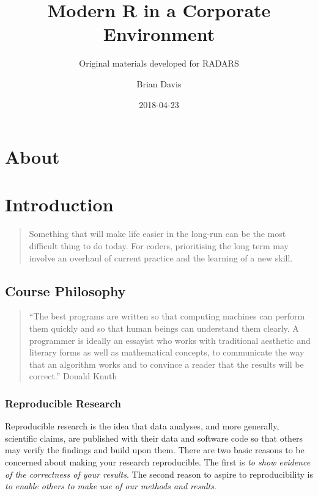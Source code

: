 \documentclass[]{book}
\title{Modern R in a Corporate Environment}
\subtitle{Original materials developed for RADARS}
\author{Brian Davis}
\date{2018-04-23}
\theoremstyle{definition}
\theoremstyle{definition}
\theoremstyle{definition}
\theoremstyle{remark}
\begin{document}
\maketitle

{
\setcounter{tocdepth}{1}
\tableofcontents
}
\chapter*{About}\label{about}

\chapter{Introduction}\label{introduction}

\begin{quote}
Something that will make life easier in the long-run can be the most
difficult thing to do today. For coders, prioritising the long term may
involve an overhaul of current practice and the learning of a new skill.
\end{quote}

\section{Course Philosophy}\label{course-philosophy}

\begin{quote}
``The best programs are written so that computing machines can perform
them quickly and so that human beings can understand them clearly. A
programmer is ideally an essayist who works with traditional aesthetic
and literary forms as well as mathematical concepts, to communicate the
way that an algorithm works and to convince a reader that the results
will be correct.'' Donald Knuth
\end{quote}

\subsection{Reproducible Research}\label{reproducible-research}

Reproducible research is the idea that data analyses, and more
generally, scientific claims, are published with their data and software
code so that others may verify the findings and build upon them. There
are two basic reasons to be concerned about making your research
reproducible. The first is \emph{to show evidence of the correctness of
your results}. The second reason to aspire to reproducibility is
\emph{to enable others to make use of our methods and results}.
\end{document}
